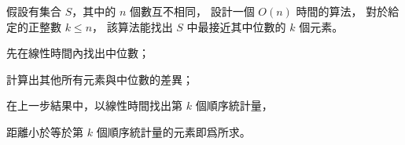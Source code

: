 \startEXERCISE
假設有集合 $S$，其中的 $n$ 個數互不相同，
設計一個 $O(n)$ 時間的算法，
對於給定的正整數 $k\le n$，
該算法能找出 $S$ 中最接近其中位數的 $k$ 個元素。
\stopEXERCISE

\startANSWER
\startigNum
\item 先在線性時間內找出中位數；
\item 計算出其他所有元素與中位數的差異；
\item 在上一步結果中，以線性時間找出第 $k$ 個順序統計量，
\item 距離小於等於第 $k$ 個順序統計量的元素即爲所求。
\stopigNum
\stopANSWER
